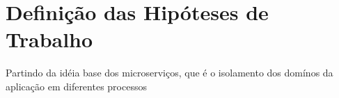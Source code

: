 \section{Definição das Hipóteses de Trabalho}

  Partindo da idéia base dos microserviços, que é o isolamento dos domínos da
  aplicação em diferentes processos

